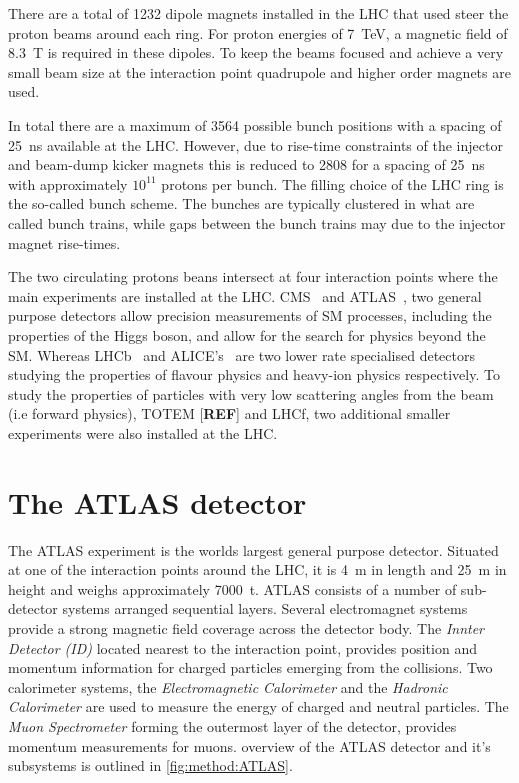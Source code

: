 There are a total of 1232 dipole magnets installed in the LHC that used steer the proton beams 
around each ring. For proton energies of \SI{7}{\tera\eV}, a magnetic field of \SI{8.3}{\tesla} 
is required in these dipoles. To keep the beams focused and achieve a very small beam size at the 
interaction point quadrupole and higher order magnets are used. 

In total there are a maximum of 3564 possible bunch positions with a spacing of \SI{25}{\nano\second} 
available at the LHC. However, due to rise-time constraints of the injector and beam-dump kicker 
magnets this is reduced to 2808 for a spacing of \SI{25}{\nano\second} with approximately $10^{11}$ 
protons per bunch. The filling choice of the LHC ring is the so-called bunch scheme. 
The bunches are typically clustered in what are called bunch trains, while gaps between the bunch 
trains may due to the injector magnet rise-times. 

The two circulating protons beans intersect at four interaction points where the main experiments
are installed at the LHC. CMS~\cite{CMS} and ATLAS~\cite{ATLAS}, two general purpose detectors 
allow precision measurements of SM processes, including the properties of the Higgs boson, and 
allow for the search for physics beyond the SM. Whereas LHCb~\cite{LHCb} and ALICE's~\cite{ALICE} 
are two lower rate specialised detectors studying the properties of flavour physics and heavy-ion 
physics respectively. To study the properties of particles with very low scattering angles from the 
beam (i.e forward physics), TOTEM [\textbf{REF}] and LHCf, two additional smaller experiments were 
also installed at the LHC.

\section{The ATLAS detector}\label{sec:method:ATLAS}

The ATLAS experiment is the worlds largest general purpose detector.  Situated at one of the 
interaction points around the LHC, it is \SI{4}{\meter} in length and \SI{25}{\meter} in height and 
weighs approximately \SI{7000}{\tonne}. ATLAS consists of a number of sub-detector systems arranged 
sequential layers. Several electromagnet systems provide a strong magnetic field coverage across the 
detector body. The \emph{Innter Detector (ID)} located nearest to the interaction point, provides 
position and momentum information for charged particles emerging from the collisions. Two calorimeter
systems, the \emph{Electromagnetic Calorimeter} and the \emph{Hadronic Calorimeter} are used to 
measure the energy of charged and neutral particles. The \emph{Muon Spectrometer} forming the 
outermost layer of the detector, provides momentum measurements for muons. overview of the ATLAS 
detector and it's subsystems is outlined in \cref{fig:method:ATLAS}.

